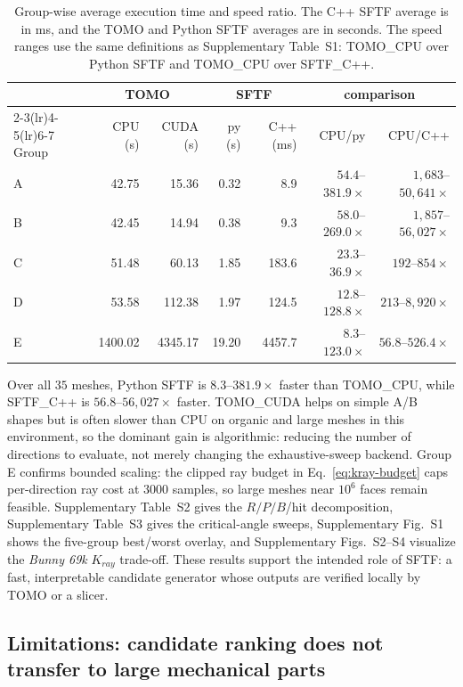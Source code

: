 \documentclass[11pt,a4paper]{article}
\begin{document}
\begin{table}[H]
\footnotesize
\centering
\caption{Group-wise average execution time and speed ratio.
The C++ SFTF average is in ms, and the TOMO and Python SFTF averages are in seconds.
The speed ranges use the same definitions as Supplementary Table~S1:
TOMO\_CPU over Python SFTF and TOMO\_CPU over SFTF\_C++.}
\label{tab:fivegroup-impl}
\begin{tabular}{lrrrrrr}
\toprule
& \multicolumn{2}{c}{TOMO} & \multicolumn{2}{c}{SFTF} & \multicolumn{2}{c}{comparison}\\
\cmidrule(lr){2-3}\cmidrule(lr){4-5}\cmidrule(lr){6-7}
Group & CPU (s) & CUDA (s) & py (s) & C++ (ms) & CPU/py & CPU/C++\\
\midrule
A & 42.75  & 15.36  & 0.32 & 8.9    & $54.4$--$381.9\times$   & $1{,}683$--$50{,}641\times$\\
B & 42.45  & 14.94  & 0.38 & 9.3    & $58.0$--$269.0\times$   & $1{,}857$--$56{,}027\times$\\
C & 51.48  & 60.13  & 1.85 & 183.6  & $23.3$--$36.9\times$   & $192$--$854\times$\\
D & 53.58  & 112.38 & 1.97 & 124.5  & $12.8$--$128.8\times$  & $213$--$8{,}920\times$\\
E & 1400.02 & 4345.17 & 19.20 & 4457.7 & $8.3$--$123.0\times$    & $56.8$--$526.4\times$\\
\bottomrule
\end{tabular}
\end{table}

Over all $35$ meshes, Python SFTF is $8.3$--$381.9\times$ faster than TOMO\_CPU, while SFTF\_C++ is $56.8$--$56{,}027\times$ faster. TOMO\_CUDA helps on simple A/B shapes but is often slower than CPU on organic and large meshes in this environment, so the dominant gain is algorithmic: reducing the number of directions to evaluate, not merely changing the exhaustive-sweep backend. Group E confirms bounded scaling: the clipped ray budget in Eq.~\eqref{eq:kray-budget} caps per-direction ray cost at $3000$ samples, so large meshes near $10^6$ faces remain feasible. Supplementary Table~S2 gives the $R/P/B$/hit decomposition, Supplementary Table~S3 gives the critical-angle sweeps, Supplementary Fig.~S1 shows the five-group best/worst overlay, and Supplementary Figs.~S2--S4 visualize the \emph{Bunny 69k} $K_{ray}$ trade-off. These results support the intended role of SFTF: a fast, interpretable candidate generator whose outputs are verified locally by TOMO or a slicer.

\subsection{Limitations: candidate ranking does not transfer to large mechanical parts}
\label{sec:limits}
\end{document}
